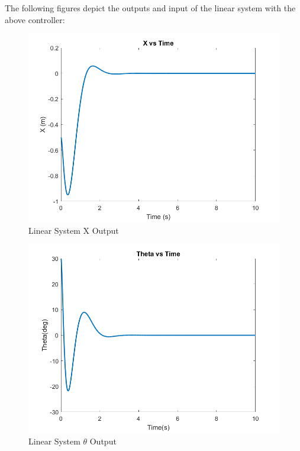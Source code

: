 The following figures depict the outputs and input of the linear system with the above controller:

\begin{figure}[!ht]
    \centering
    \includegraphics[width=\linewidth]{figs/sfsp_x.png}
    \caption{Linear System X Output}
    \label{}
\end{figure}

\begin{figure}[!ht]
    \centering
    \includegraphics[width=\linewidth]{figs/sfsp_theta.png}
    \caption{Linear System $\theta$ Output}
    \label{}
\end{figure}


